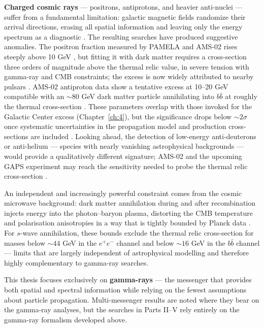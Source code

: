 \textbf{Charged cosmic rays} --- positrons, antiprotons, and heavier anti-nuclei --- suffer from a fundamental limitation: galactic magnetic fields randomize their arrival directions, erasing all spatial information and leaving only the energy spectrum as a diagnostic \cite{Cirelli:2024ssz,Pinetti:2021jjs}.
The resulting searches have produced suggestive anomalies.
The positron fraction measured by PAMELA and AMS-02 rises steeply above 10 GeV \cite{PAMELA:2008gwm,Cirelli:2024ssz}, but fitting it with dark matter requires a cross-section three orders of magnitude above the thermal relic value, in severe tension with gamma-ray and CMB constraints; the excess is now widely attributed to nearby pulsars \cite{Cirelli:2024ssz,Hooper:2024}.
AMS-02 antiproton data show a tentative excess at 10--20 GeV compatible with an $\sim$80 GeV dark matter particle annihilating into $b\bar{b}$ at roughly the thermal cross-section \cite{Cuoco:2016eej,Cirelli:2024ssz}.
These parameters overlap with those invoked for the Galactic Center excess (Chapter~\ref{ch:4}), but the significance drops below $\sim 2\sigma$ once systematic uncertainties in the propagation model and production cross-sections are included \cite{Cirelli:2024ssz}.
Looking ahead, the detection of low-energy anti-deuterons or anti-helium --- species with nearly vanishing astrophysical backgrounds --- would provide a qualitatively different signature; AMS-02 and the upcoming GAPS experiment may reach the sensitivity needed to probe the thermal relic cross-section \cite{Cirelli:2024ssz,Hooper:2024}.

An independent and increasingly powerful constraint comes from the cosmic microwave background: dark matter annihilation during and after recombination injects energy into the photon--baryon plasma, distorting the CMB temperature and polarisation anisotropies in a way that is tightly bounded by Planck data \cite{Ade:2015xua,Cirelli:2024ssz}.
For $s$-wave annihilation, these bounds exclude the thermal relic cross-section for masses below $\sim 44$ GeV in the $e^+e^-$ channel and below $\sim 16$ GeV in the $b\bar{b}$ channel \cite{Ade:2015xua} --- limits that are largely independent of astrophysical modelling and therefore highly complementary to gamma-ray searches.

This thesis focuses exclusively on \textbf{gamma-rays} --- the messenger that provides both spatial and spectral information while relying on the fewest assumptions about particle propagation.
Multi-messenger results are noted where they bear on the gamma-ray analyses, but the searches in Parts II--V rely entirely on the gamma-ray formalism developed above.

